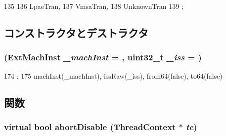 \begin{DoxyCode}
135     {
136         LpaeTran,
137         VmsaTran,
138         UnknownTran
139     };
\end{DoxyCode}


\subsection{コンストラクタとデストラクタ}
\hypertarget{classArmISA_1_1ArmFault_a0b41a5f87b01c7e5df6f1b05d86d506e}{
\subsubsection[{ArmFault}]{ (ExtMachInst {\em \_\-machInst} = {}, \/  {\bf uint32\_\-t} {\em \_\-iss} = {})}}
\label{classArmISA_1_1ArmFault_a0b41a5f87b01c7e5df6f1b05d86d506e}



\begin{DoxyCode}
174                                                            :
175         machInst(_machInst), issRaw(_iss), from64(false), to64(false) {}

\end{DoxyCode}


\subsection{関数}
\hypertarget{classArmISA_1_1ArmFault_a159a2321e7b2cdb89571d6bb04064c4a}{
\subsubsection[{abortDisable}]{\setlength{\rightskip}{0pt plus 5cm}virtual bool abortDisable ({\bf ThreadContext} $\ast$ {\em tc})}}
\label{classArmISA_1_1ArmFault_a159a2321e7b2cdb89571d6bb04064c4a}


